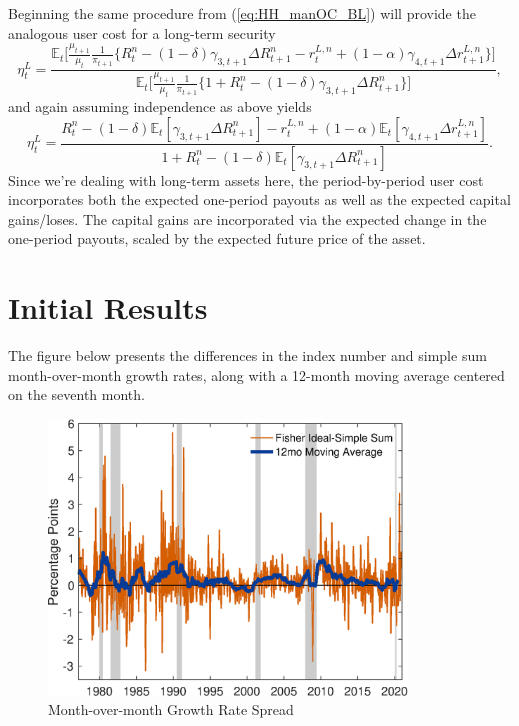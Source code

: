 \documentclass[11pt,a4paper,margin=1.5in]{article}
\begin{document}
Beginning the same procedure from (\ref{eq:HH_manOC_BL}) will provide the analogous user cost for a long-term security
\begin{equation}
\eta^L_t = \frac{\mathbb{E}_t \Big[ \frac{\mu_{t+1}}{\mu_{t}}\frac{1}{\pi_{t+1}} \Big\{ R^n_t - (1-\delta)\gamma_{3,t+1}\Delta R^n_{t+1} - r^{L,n}_t + (1-\alpha)\gamma_{4,t+1}\Delta r^{L,n}_{t+1}\Big\}\Big]}{\mathbb{E}_t \Big[ \frac{\mu_{t+1}}{\mu_{t}}\frac{1}{\pi_{t+1}} \Big\{ 1+ R^n_t - (1-\delta)\gamma_{3,t+1}\Delta R^n_{t+1}\Big\}\Big]},
\end{equation}
and again assuming independence as above yields
\begin{equation}
\eta^L_t = \frac{R^n_t - (1-\delta)\mathbb{E}_t[\gamma_{3,t+1}\Delta R^n_{t+1}] - r^{L,n}_t + (1-\alpha)\mathbb{E}_t[\gamma_{4,t+1}\Delta r^{L,n}_{t+1}]}{1+ R^n_t - (1-\delta)\mathbb{E}_t[\gamma_{3,t+1}\Delta R^n_{t+1}]}.
\label{eq:usercost_LT}
\end{equation}
Since we're dealing with long-term assets here, the period-by-period user cost incorporates both the expected one-period payouts as well as the expected capital gains/loses.
The capital gains are incorporated via the expected change in the one-period payouts, scaled by the expected future price of the asset.

\newpage
\section{Initial Results}
\label{app:initial_results}
The figure below presents the differences in the index number and simple sum month-over-month growth rates, along with a 12-month moving average centered on the seventh month.
\begin{figure}[h]
	\centering
	\includegraphics[width=0.85\textwidth]{../Figures/GrowthDiff_v2.eps}
	\caption{Month-over-month Growth Rate Spread}
	\label{fig:Growth_Spread}
\end{figure}
\end{document}
